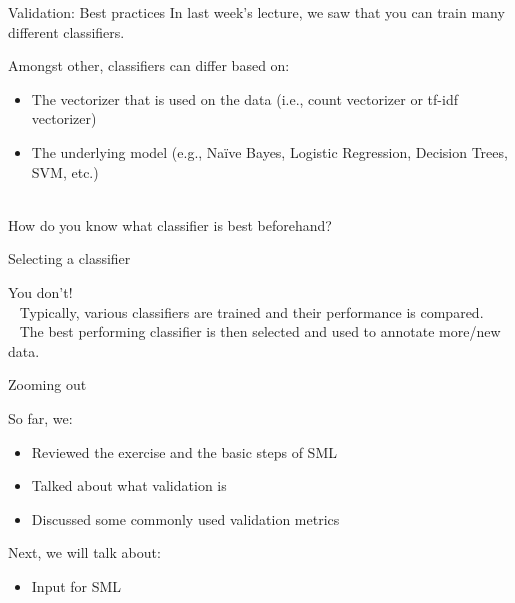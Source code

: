 \documentclass[compress]{beamer}
\begin{document}
\begin{frame}{Validation: Best practices}
In last week's lecture, we saw that you can train many different classifiers.  

\begin{alertblock}{Amongst other, classifiers can differ based on:}
	\begin{itemize}
		\item The vectorizer that is used on the data (i.e., count vectorizer or tf-idf vectorizer)
		\item The underlying model (e.g., Naïve Bayes, Logistic Regression, Decision Trees, SVM, etc.)\\\
	\end{itemize}
\end{alertblock}
\pause
How do you know what classifier is best beforehand?
\end{frame}


\begin{frame}{Selecting a classifier}

You don't!\\\
\pause
Typically, various classifiers are trained and their performance is compared.\\\
\pause
The best performing classifier is then selected and used to annotate more/new data.
\end{frame}



\begin{frame}[fragile]{Zooming out} 
	
\begin{alertblock}{So far, we:}
\begin{itemize}
	\item Reviewed the exercise and the basic steps of SML
	\item Talked about what validation is
	\item Discussed some commonly used validation metrics
\end{itemize}
\end{alertblock}
	
\begin{alertblock}{Next, we will talk about:}
\begin{itemize}
	\item Input for SML
\end{itemize}
\end{alertblock}	
\end{frame}
\end{document}
